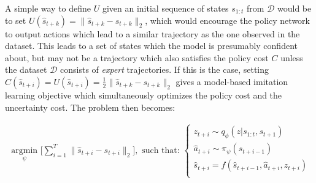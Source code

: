\documentclass{article} %
\begin{document}


A simple way to define $U$ given an initial sequence of states $s_{1:t}$ from $\mathcal{D}$ would be to set $U(\hat{s}_{t+k}) = \| \hat{s}_{t+k} - s_{t+k} \|_2$, which would encourage the policy network to output actions which lead to a similar trajectory as the one observed in the dataset.
This leads to a set of states which the model is presumably confident about, but may not be a trajectory which also satisfies the policy cost $\textit{C}$ unless the dataset $\mathcal{D}$ consists of \textit{expert} trajectories.
If this is the case, setting $C(\hat{s}_{t+i}) = U(\hat{s}_{t+i}) = \frac{1}{2} \| \hat{s}_{t+k} - s_{t+k} \|_2$ gives a model-based imitation learning objective which simultaneously optimizes the policy cost and the uncertainty cost. The problem then becomes:

        \begin{align*}
    \underset{\psi}{\mbox{ argmin }} \Big[ \sum_{i=1}^{T} \| \hat{s}_{t+i} - s_{t+i} \|_2 \Big],  \mbox{ such that: }
    \begin{cases}
      z_{t+i} \sim q_\phi(z | s_{1:t}, s_{t+1}) \\
      \hat{a}_{t+i} \sim \pi_\psi(\hat{s}_{t+i-1}) \\
      \hat{s}_{t+i} = f(\hat{s}_{t+i-1}, \hat{a}_{t+i}, z_{t+i}) \\
      \end{cases}
        \end{align*}


\end{document}
